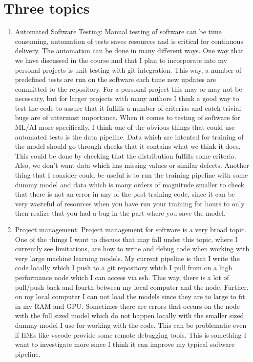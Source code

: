 \documentclass{article}
\begin{document}
\section{Three topics}
\begin{enumerate}
    \item Automated Software Testing: Manual testing of software can be time consuming, automation of tests saves resources and is critical for continuous delivery. The automation can be done in many different ways. One way that we have discussed in the course and that I plan to incorporate into my personal projects is unit testing with git integration. This way, a number of predefined tests are run on the software each time new updates are committed to the repository. For a personal project this may or may not be necessary, but for larger projects with many authors I think a good way to test the code to assure that it fulfills a number of criterias and catch trivial bugs are of uttermost importance. When it comes to testing of software for ML/AI more specifically, I think one of the obvious things that could use automated tests is the data pipeline. Data which are intented for training of the model should go through checks that it contains what we think it does. This could be done by checking that the distribution fulfills some criteria. Also, we don't want data which has missing values or similar defects. Another thing that I consider could be useful is to run the training pipeline with some dummy model and data which is many orders of magnitude smaller to check that there is not an error in any of the post training code, since it can be very wasteful of resources when you have run your training for hours to only then realize that you had a bug in the part where you save the model.
    
    \item Project management: Project management for software is a very broad topic. One of the things I want to discuss that may fall under this topic, where I currently see limitations, are how to write and debug code when working with very large machine learning models. My current pipeline is that I write the code locally which I push to a git repository which I pull from on a high performance node which I can access via ssh. This way, there is a lot of pull/push back and fourth between my local computer and the node. Further, on my local computer I can not load the models since they are to large to fit in my RAM and GPU. Sometimes there are errors that occurs on the node with the full sized model which do not happen locally with the smaller sized dummy model I use for working with the code. This can be problematic even if IDEs like vscode provide some remote debugging tools. This is something I want to investigate more since I think it can improve my typical software pipeline.
    

\end{enumerate}
\end{document}
